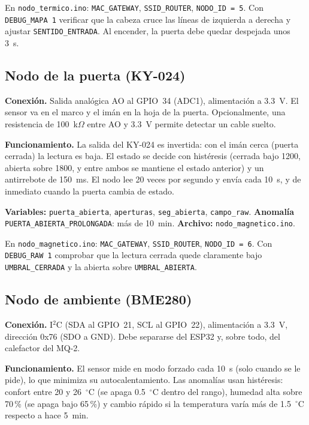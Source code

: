 \documentclass[11pt,a4paper]{article}
\newcommand{\arch}[1]{\texttt{#1}}
\begin{document}
\begin{completar}
En \arch{nodo\_termico.ino}: \texttt{MAC\_GATEWAY}, \texttt{SSID\_ROUTER}, \texttt{NODO\_ID = 5}.
Con \texttt{DEBUG\_MAPA 1} verificar que la cabeza cruce las l\'ineas de izquierda a derecha y
ajustar \texttt{SENTIDO\_ENTRADA}. Al encender, la puerta debe quedar despejada unos 3~s.
\end{completar}

\subsection{Nodo de la puerta (KY-024)}

\textbf{Conexi\'on.} Salida anal\'ogica AO al GPIO~34 (ADC1), alimentaci\'on a 3.3~V. El sensor
va en el marco y el im\'an en la hoja de la puerta. Opcionalmente, una resistencia de 100~k$\Omega$
entre AO y 3.3~V permite detectar un cable suelto.

\textbf{Funcionamiento.} La salida del KY-024 es invertida: con el im\'an cerca (puerta cerrada)
la lectura es baja. El estado se decide con hist\'eresis (cerrada bajo 1200, abierta sobre 1800,
y entre ambos se mantiene el estado anterior) y un antirrebote de 150~ms. El nodo lee 20 veces por
segundo y env\'ia cada 10~s, y de inmediato cuando la puerta cambia de estado.

\textbf{Variables:} \texttt{puerta\_abierta}, \texttt{aperturas}, \texttt{seg\_abierta},
\texttt{campo\_raw}. \textbf{Anomal\'ia} \texttt{PUERTA\_ABIERTA\_PROLONGADA}: m\'as de 10~min.
\textbf{Archivo:} \arch{nodo\_magnetico.ino}.

\begin{completar}
En \arch{nodo\_magnetico.ino}: \texttt{MAC\_GATEWAY}, \texttt{SSID\_ROUTER}, \texttt{NODO\_ID = 6}.
Con \texttt{DEBUG\_RAW 1} comprobar que la lectura cerrada quede claramente bajo
\texttt{UMBRAL\_CERRADA} y la abierta sobre \texttt{UMBRAL\_ABIERTA}.
\end{completar}

\subsection{Nodo de ambiente (BME280)}

\textbf{Conexi\'on.} I$^2$C (SDA al GPIO~21, SCL al GPIO~22), alimentaci\'on a 3.3~V, direcci\'on
0x76 (SDO a GND). Debe separarse del ESP32 y, sobre todo, del calefactor del MQ-2.

\textbf{Funcionamiento.} El sensor mide en modo forzado cada 10~s (solo cuando se le pide), lo
que minimiza su autocalentamiento. Las anomal\'ias usan hist\'eresis: confort entre 20 y 26~$^\circ$C
(se apaga 0.5~$^\circ$C dentro del rango), humedad alta sobre 70\,\% (se apaga bajo 65\,\%) y cambio
r\'apido si la temperatura var\'ia m\'as de 1.5~$^\circ$C respecto a hace 5~min.
\end{document}
